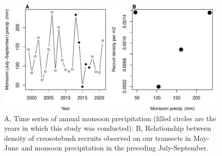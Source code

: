 \documentclass[11pt]{article}\usepackage[]{graphicx}\usepackage[usenames,dvipsnames]{xcolor}
\begin{document}
\newpage
\begin{figure}[H]
  \begin{center}
    \includegraphics[width=\linewidth]{Figures/MonsoonSeedlings}
  \caption{A, Time series of annual monsoon precipitation (filled circles are the years in which this study was conducted). B, Relationship between density of creosotebush recruits observed on our transects in May-June and monsoon precipitation in the preceding July-September.}
  \label{fig:monsoon}
  \end{center}
\end{figure}
\end{document}
